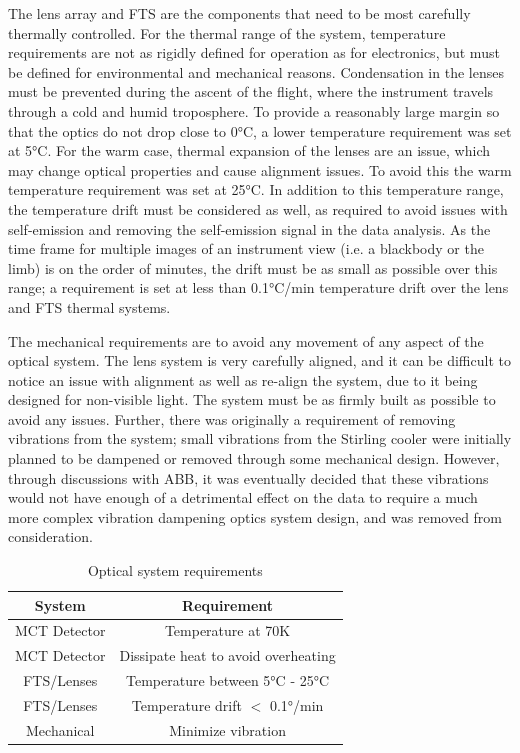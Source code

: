 The lens array and FTS are the components that need to be most carefully thermally controlled. For the thermal range of the system, temperature requirements are not as rigidly defined for operation as for electronics, but must be defined for environmental and mechanical reasons. Condensation in the lenses must be prevented during the ascent of the flight, where the instrument travels through a cold and humid troposphere. To provide a reasonably large margin so that the optics do not drop close to 0°C, a lower temperature requirement was set at 5°C. For the warm case, thermal expansion of the lenses are an issue, which may change optical properties and cause alignment issues. To avoid this the warm temperature requirement was set at 25°C. In addition to this temperature range, the temperature drift must be considered as well, as required to avoid issues with self-emission and removing the self-emission signal in the data analysis. As the time frame for multiple images of an instrument view (i.e. a blackbody or the limb) is on the order of minutes, the drift must be as small as possible over this range; a requirement is set at less than 0.1°C/min temperature drift over the lens and FTS thermal systems. 

The mechanical requirements are to avoid any movement of any aspect of the optical system. The lens system is very carefully aligned, and it can be difficult to notice an issue with alignment as well as re-align the system, due to it being designed for non-visible light. The system must be as firmly built as possible to avoid any issues. Further, there was originally a requirement of removing vibrations from the system; small vibrations from the Stirling cooler were initially planned to be dampened or removed through some mechanical design. However, through discussions with ABB, it was eventually decided that these vibrations would not have enough of a detrimental effect on the data to require a much more complex vibration dampening optics system design, and was removed from consideration.

\begin{table}[h]
\begin{center}
\begin{tabular}{ |c|c| }
 \hline
 \rowcolor{lightgray}
 System & Requirement\\
  \hline
  \hline
  MCT Detector & Temperature at 70K\\
 \hline
  MCT Detector & Dissipate heat to avoid overheating\\
 \hline
 FTS/Lenses & Temperature between 5°C - 25°C\\
 \hline
 FTS/Lenses & Temperature drift $<$ 0.1°/min\\
 \hline
 Mechanical & Minimize vibration\\
 \hline
\end{tabular}
\end{center}
\caption{Optical system requirements}
 \label{optics_req_table}
\end{table}


